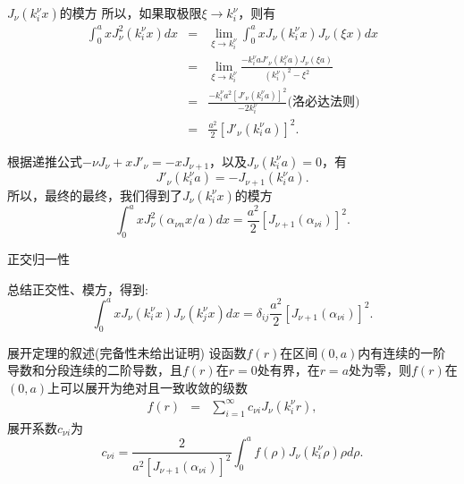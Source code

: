 \documentclass[11pt]{beamer}
\begin{document}
\begin{frame}{$J_\nu(k^\nu_i x)$的模方}
所以，如果取极限$\xi \rightarrow k^\nu_i$，则有
\begin{eqnarray}
\int^a_0 x J^2_\nu(k^\nu_i x) dx
&=& \lim\limits_{\xi \rightarrow k^\nu_i} \int^a_0 x J_\nu(k^\nu_i x) J_\nu(\xi x) dx
\nonumber\\
&=& \lim\limits_{\xi \rightarrow k^\nu_i}　\frac{- k^\nu_i aJ'_\nu(k^\nu_ia) J_\nu(\xi a)}{(k^\nu_i)^2 - \xi^2}
\nonumber\\
&=& \frac{ -k^\nu_i a^2 [ J'_\nu(k^\nu_i a )]^2 }{ - 2 k^\nu_i }
{\text{(洛必达法则)}}
\nonumber\\
&=& \frac{a^2}{2} [ J'_\nu(k^\nu_i a )]^2.
\end{eqnarray}

根据递推公式$ - \nu J_\nu + x J'_\nu = -x J_{\nu+1}$，以及$J_\nu(k^\nu_i a) = 0$，有
\begin{equation}
J'_\nu(k^\nu_i a) = - J_{\nu+1}(k^\nu_i a).
\end{equation}
所以，最终的最终，我们得到了$J_\nu(k^\nu_i x)$的模方
\begin{equation}
\int^a_0 x J^2_\nu( \alpha_{\nu n} x / a) dx = \frac{a^2}{2} [ J_{\nu+1}( \alpha_{\nu i}) ]^2.
\end{equation}
\end{frame}

\begin{frame}{正交归一性}

总结正交性、模方，得到:
\begin{equation}
\int^a_0 x J_\nu( k^\nu_i x )　J_\nu( k^\nu_j x ) dx = \delta_{ij} \frac{a^2}{2} [ J_{\nu+1}( \alpha_{\nu i}) ]^2.
\end{equation}

\end{frame}

\begin{frame}{展开定理的叙述(完备性未给出证明)}
设函数$f(r)$在区间$(0,a)$内有连续的一阶导数和分段连续的二阶导数，且$f(r)$在$r=0$处有界，在$r=a$处为零，则$f(r)$在$(0,a)$上可以展开为绝对且一致收敛的级数
\begin{eqnarray}
f(r) &=& \sum^\infty_{i=1} c_{\nu i} J_\nu ( k^\nu_i r), 
\end{eqnarray}
展开系数$c_{\nu i}$为
\begin{equation}
c_{\nu i} = \frac{2}{a^2 [J_{\nu +1}(\alpha_{\nu i})]^2}
\int^a_0 f(\rho) J_\nu( k^\nu_i \rho ) \rho d \rho.
\end{equation}
\end{frame}
\end{document}

